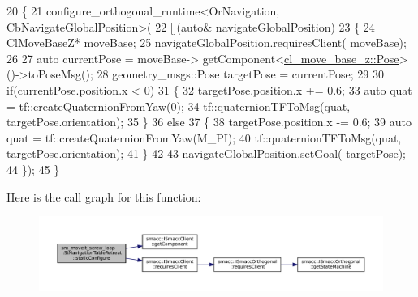 \begin{DoxyCode}
20         \{
21             configure\_orthogonal\_runtime<OrNavigation, CbNavigateGlobalPosition>(
22                                                                 [](\textcolor{keyword}{auto}& navigateGlobalPosition)
23                                                                 \{
24                                                                     ClMoveBaseZ* moveBase;
25                                                                     navigateGlobalPosition.requiresClient(
      moveBase);
26 
27                                                                     \textcolor{keyword}{auto} currentPose = moveBase->
      getComponent<\hyperlink{classcl__move__base__z_1_1Pose}{cl\_move\_base\_z::Pose}>()->toPoseMsg();
28                                                                     geometry\_msgs::Pose targetPose = 
      currentPose;
29 
30                                                                     \textcolor{keywordflow}{if}(currentPose.position.x < 0)
31                                                                     \{
32                                                                         targetPose.position.x += 0.6;
33                                                                         \textcolor{keyword}{auto} quat = 
      tf::createQuaternionFromYaw(0);
34                                                                         tf::quaternionTFToMsg(quat, 
      targetPose.orientation);
35                                                                     \}
36                                                                     \textcolor{keywordflow}{else}
37                                                                     \{
38                                                                         targetPose.position.x -= 0.6;
39                                                                         \textcolor{keyword}{auto} quat = 
      tf::createQuaternionFromYaw(M\_PI);
40                                                                         tf::quaternionTFToMsg(quat, 
      targetPose.orientation);
41                                                                     \}
42 
43                                                                     navigateGlobalPosition.setGoal(
      targetPose);
44                                                                 \});
45         \}
\end{DoxyCode}
Here is the call graph for this function\+:
\nopagebreak
\begin{figure}[H]
\begin{center}
\leavevmode
\includegraphics[width=350pt]{structsm__moveit__screw__loop_1_1StNavigationTableRetreat_a44efd3dfb0eed47259e7817d62151e5d_cgraph}
\end{center}
\end{figure}


